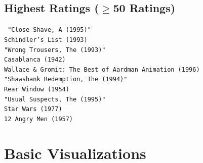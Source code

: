 \begin{appendices}
\subsection{Highest Ratings (\texorpdfstring{$\geq$}\ 50 Ratings)}
\label{appendix:highestpruned}
\texttt{%
  "Close Shave, A (1995)" \\
  Schindler's List (1993) \\
  "Wrong Trousers, The (1993)" \\
  Casablanca (1942) \\
  Wallace \& Gromit: The Best of Aardman Animation (1996) \\
  "Shawshank Redemption, The (1994)" \\
  Rear Window (1954) \\
  "Usual Suspects, The (1995)" \\
  Star Wars (1977) \\
  12 Angry Men (1957)
}

\pagebreak

\section{Basic Visualizations}


\end{appendices}
